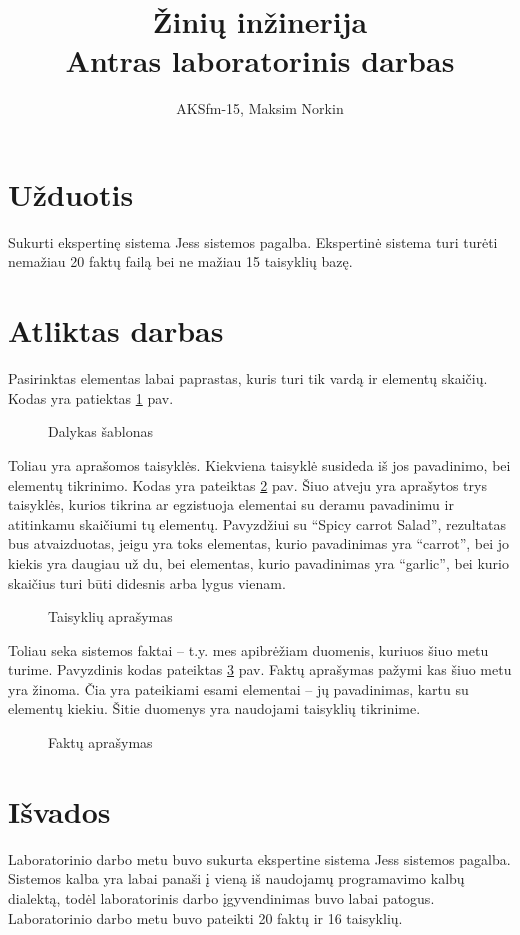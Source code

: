 \documentclass[11pt, a4paper, lithuanian]{article}
\author{AKSfm-15, Maksim Norkin}
\title{Žinių inžinerija\\Antras laboratorinis darbas}
\begin{document}
    \maketitle

    \section{Užduotis}

    Sukurti ekspertinę sistema Jess sistemos pagalba. Ekspertinė sistema turi turėti nemažiau 20 faktų failą bei ne mažiau 15 taisyklių bazę. 

    \section{Atliktas darbas}

    Pasirinktas elementas labai paprastas, kuris turi tik vardą ir elementų skaičių. Kodas yra patiektas \ref{code:template-item} pav.

    \begin{figure}[h!]
      \centering
      
      \caption{Dalykas šablonas}
      \label{code:template-item}
    \end{figure}

    Toliau yra aprašomos taisyklės. Kiekviena taisyklė susideda iš jos pavadinimo, bei elementų tikrinimo. Kodas yra pateiktas \ref{code:rule-three} pav. Šiuo atveju yra aprašytos trys taisyklės, kurios tikrina ar egzistuoja elementai su deramu pavadinimu ir atitinkamu skaičiumi tų elementų. Pavyzdžiui su ``Spicy carrot Salad'', rezultatas bus atvaizduotas, jeigu yra toks elementas, kurio pavadinimas yra ``carrot'', bei jo kiekis yra daugiau už du, bei elementas, kurio pavadinimas yra ``garlic'', bei kurio skaičius turi būti didesnis arba lygus vienam.

    \begin{figure}[h!]
      \centering
      
      \caption{Taisyklių aprašymas}
      \label{code:rule-three}
    \end{figure}

    Toliau seka sistemos faktai -- t.y. mes apibrėžiam duomenis, kuriuos šiuo metu turime. Pavyzdinis kodas pateiktas \ref{code:fact-four} pav. Faktų aprašymas pažymi kas šiuo metu yra žinoma. Čia yra pateikiami esami elementai -- jų pavadinimas, kartu su elementų kiekiu. Šitie duomenys yra naudojami taisyklių tikrinime.

    \begin{figure}[h!]
      \centering
      
      \caption{Faktų aprašymas}
      \label{code:fact-four}
    \end{figure}

    \section{Išvados}

    Laboratorinio darbo metu buvo sukurta ekspertine sistema Jess sistemos pagalba. Sistemos kalba yra labai panaši į vieną iš naudojamų programavimo kalbų dialektą, todėl laboratorinis darbo įgyvendinimas buvo labai patogus. Laboratorinio darbo metu buvo pateikti 20 faktų ir 16 taisyklių.
\end{document}
